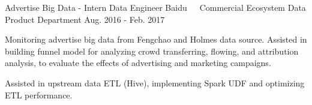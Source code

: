 \documentclass[11pt, a4paper, UTF8]{awesome-cv}
\begin{document}
\begin{cventries}
  \cventry
    {Advertise Big Data - Intern Data Engineer} %
    {Baidu{\ \cdotp\ \ }Commercial Ecosystem Data Product Department} %
    {Aug. 2016 - Feb. 2017} %
    {\ } %
    {
      \begin{cvitems} %
        \item {Monitoring advertise big data from Fengchao and Holmes data source. Assisted in building funnel model for analyzing crowd transferring, flowing, and attribution analysis, to evaluate the effects of advertising and marketing campaigns.}
        \item {Assisted in upstream data ETL (Hive), implementing Spark UDF and optimizing ETL performance.}
      \end{cvitems}
    }
        
\end{cventries}
\end{document}
